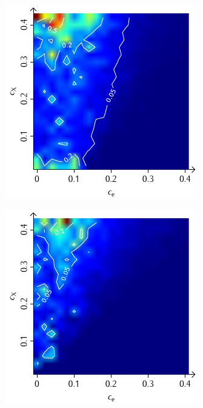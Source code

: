 \documentclass[a4paper, 10pt, twoside, openany]{book} %
\begin{document}
\begin{figure}
\begin{minipage}[t]{0.48\textwidth}
        \label{H_penalty_cluster_G}
    \end{minipage}
    \begin{minipage}[t]{0.48\textwidth}
        \includegraphics[width=\textwidth]{Abbildungen/Phasendiagramme/Konturen/H_random_G.pdf}
        \label{H_random_G}
    \end{minipage}
    \hfill
    \begin{minipage}[t]{0.48\textwidth}
        \includegraphics[width=\textwidth]{Abbildungen/Phasendiagramme/Konturen/H_penalty_random_G.pdf}

\end{minipage}
\end{figure}
\end{document}

